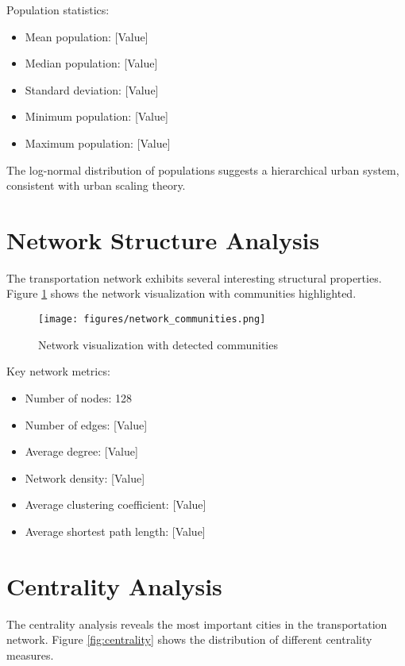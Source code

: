 Population statistics:
\begin{itemize}
    \item Mean population: [Value]
    \item Median population: [Value]
    \item Standard deviation: [Value]
    \item Minimum population: [Value]
    \item Maximum population: [Value]
\end{itemize}

The log-normal distribution of populations suggests a hierarchical urban system, consistent with urban scaling theory.

\section{Network Structure Analysis}
The transportation network exhibits several interesting structural properties. Figure \ref{fig:network} shows the network visualization with communities highlighted.

\begin{figure}[H]
    \centering
    \texttt{[image: figures/network\_communities.png]}
    \caption{Network visualization with detected communities}
    \label{fig:network}
\end{figure}

Key network metrics:
\begin{itemize}
    \item Number of nodes: 128
    \item Number of edges: [Value]
    \item Average degree: [Value]
    \item Network density: [Value]
    \item Average clustering coefficient: [Value]
    \item Average shortest path length: [Value]
\end{itemize}

\section{Centrality Analysis}
The centrality analysis reveals the most important cities in the transportation network. Figure \ref{fig:centrality} shows the distribution of different centrality measures.

